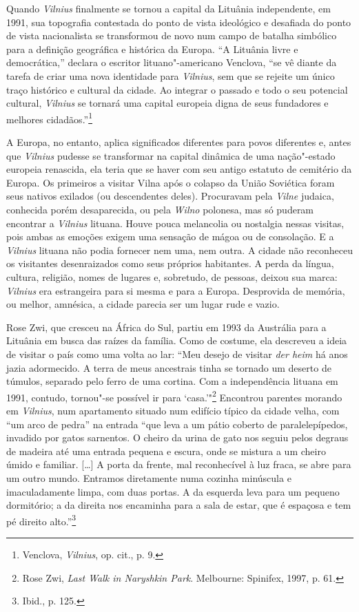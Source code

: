 Quando \textit{Vilnius} finalmente se tornou a capital da Lituânia independente,
em 1991, sua topografia contestada do ponto de vista ideológico e desafiada do ponto de vista nacionalista se transformou de novo num campo de batalha simbólico para a
definição geográfica e histórica da Europa. ``A Lituânia livre e
democrática,'' declara o escritor lituano"-americano Venclova, ``se vê
diante da tarefa de criar uma nova identidade para \textit{Vilnius}, sem que se
rejeite um único traço histórico e cultural da cidade. Ao integrar o
passado e todo o seu potencial cultural, \textit{Vilnius} se tornará uma capital
europeia digna de seus fundadores e melhores cidadãos.''\footnote{Venclova, \textit{Vilnius}, op. cit., p. 9.}
\asterisc

A Europa, no entanto, aplica significados diferentes para povos
diferentes e, antes que \textit{Vilnius} pudesse se transformar na capital
dinâmica de uma nação"-estado europeia renascida, ela teria que se haver
com seu antigo estatuto de cemitério da Europa. Os primeiros a visitar
Vilna após o colapso da União Soviética foram seus nativos exilados (ou
descendentes deles). Procuravam pela \textit{Vilne} judaica, conhecida porém
desaparecida, ou pela \textit{Wilno} polonesa, mas só puderam encontrar a \textit{Vilnius}
lituana. Houve pouca melancolia ou nostalgia nessas visitas, pois ambas
as emoções exigem uma sensação de mágoa ou de consolação. E a \textit{Vilnius}
lituana não podia fornecer nem uma, nem outra. A cidade não reconheceu
os visitantes desenraizados como seus próprios habitantes. A perda da
língua, cultura, religião, nomes de lugares e, sobretudo, de pessoas,
deixou sua marca: \textit{Vilnius} era estrangeira para si mesma e para a Europa.
Desprovida de memória, ou melhor, amnésica, a cidade parecia ser um
lugar rude e vazio.

Rose Zwi, que cresceu na África do Sul, partiu em 1993 da Austrália para
a Lituânia em busca das raízes da família. Como de costume, ela
descreveu a ideia de visitar o país como uma volta ao lar: ``Meu desejo
de visitar \textit{der heim} há anos jazia adormecido. A terra de meus
ancestrais tinha se tornado um deserto de túmulos, separado pelo ferro
de uma cortina. Com a independência lituana em 1991, contudo, tornou"-se
possível ir para `casa.'"\footnote{Rose Zwi, \textit{Last Walk in Naryshkin Park}. Melbourne: Spinifex, 1997, p. 61.} Encontrou parentes morando em \textit{Vilnius}, num apartamento situado num edifício típico
da cidade velha, com ``um arco de pedra'' na entrada ``que leva a um
pátio coberto de paralelepípedos, invadido por gatos sarnentos. O cheiro
da urina de gato nos seguiu pelos degraus de madeira até uma entrada
pequena e escura, onde se mistura a um cheiro úmido e familiar. [\ldots{}]
A porta da frente, mal reconhecível à luz fraca, se abre para um outro
mundo. Entramos diretamente numa cozinha minúscula e imaculadamente
limpa, com duas portas. A da esquerda leva para um pequeno dormitório; a
da direita nos encaminha para a sala de estar, que é espaçosa e tem pé
direito alto.''\footnote{Ibid., p. 125.}

